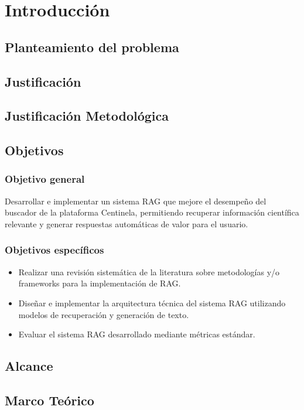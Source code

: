 \chapter{Introducción}

\section{Planteamiento del problema}

\section{Justificación}

\section{Justificación Metodológica}

\section{Objetivos}
\subsection{Objetivo general}
Desarrollar e implementar un sistema RAG que mejore el desempeño del buscador de la plataforma
Centinela, permitiendo recuperar información científica relevante y generar respuestas automáticas
de valor para el usuario.
\subsection{Objetivos específicos}
\begin{itemize}[align=left, label=-]
    \item Realizar una revisión sistemática de la literatura sobre metodologías y/o frameworks para la implementación de RAG.
    \item Diseñar e implementar la arquitectura técnica del sistema RAG utilizando modelos de recuperación y generación de texto.
    \item Evaluar el sistema RAG desarrollado mediante métricas estándar.
\end{itemize}

\section{Alcance}

\section{Marco Teórico}


